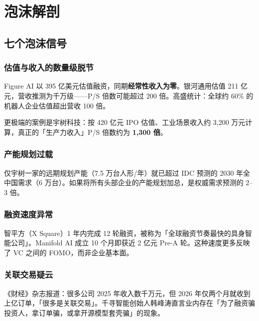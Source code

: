 \chapter{泡沫解剖}
\label{ch:bubble}

\section{七个泡沫信号}

\subsection{估值与收入的数量级脱节}

Figure AI 以 395 亿美元估值融资，同期\textbf{经常性收入为零}\cite{figure2025seriesc}。银河通用估值 211 亿元，营收推测为千万级——P/S 倍数可能超过 200 倍\cite{galbot2026aplus}。高盛统计：全球约 60\% 的机器人企业估值超出营收 100 倍\cite{gs2025roboticsoutlook}。

更极端的案例是宇树科技：按 420 亿元 IPO 估值、工业场景收入约 3,200 万元计算，真正的「生产力收入」P/S 倍数约为 \textbf{1,300 倍}\cite{unitree2026ipo}。

\subsection{产能规划过载}

仅宇树一家的远期规划产能（7.5 万台人形/年）就已超过 IDC 预测的 2030 年全中国需求（6 万台）\cite{idc2025humanoid,unitree2026ipo}。如果将所有头部企业的产能规划加总，是权威需求预测的 2--3 倍。

\subsection{融资速度异常}

智平方（X Square）1 年内完成 12 轮融资，被称为「全球融资节奏最快的具身智能公司」\cite{xsquare2026}。Manifold AI 成立 10 个月即获近 2 亿元 Pre-A 轮。这种速度更多反映了 VC 之间的 FOMO，而非企业基本面。

\subsection{关联交易疑云}

《财经》杂志报道\cite{caijing2026robots}：很多公司 2025 年收入数千万元，但 2026 年仅两个月就收到上亿订单，「很多是关联交易」。千寻智能创始人韩峰涛直言业内存在「为了融资骗投资人，拿订单骗，或拿开源模型套壳骗」的现象\cite{qianxun2026fraud}。

